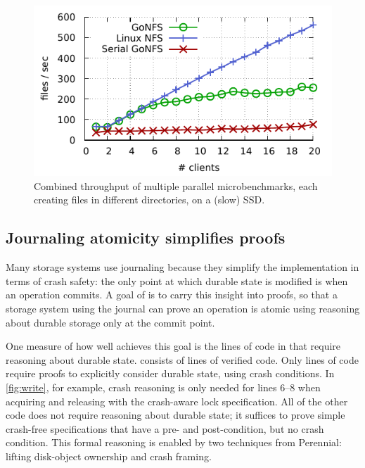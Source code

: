 \begin{figure}[ht!]
  \centering

  \includegraphics[scale=0.9]{fig/scale.pdf}

  \caption{Combined throughput of multiple parallel 
    microbenchmarks, each creating files in different directories,
    on a (slow) SSD.}
  \label{fig:scale-ssd}
\end{figure}

\subsection{Journaling atomicity simplifies proofs}
\label{sec:eval:atomic}

Many storage systems use journaling because they simplify the
implementation in terms of crash safety: the only point at which durable
state is modified is when an operation commits.  A goal of
\txn is to carry this insight into proofs, so that a storage system
using the journal can prove an operation is atomic using reasoning about durable
storage only at the commit point.

One measure of how well \txn achieves this goal is the lines of code in
\simplenfs that require reasoning about durable state.  \simplenfs
consists of \simplenfsLOC{} lines of verified code.  Only \simplenfsCrashLOC{} lines of code require
proofs to explicitly consider durable state, using crash conditions.
In \autoref{fig:write}, for example, crash reasoning is only needed for lines
6--8 when acquiring and releasing with the crash-aware lock specification.  All
of the other
code does not require reasoning about durable state; it suffices to prove
simple crash-free specifications that have a pre- and post-condition, but
no crash condition.  This formal reasoning is enabled by two techniques
from Perennial: lifting disk-object ownership and crash framing.

